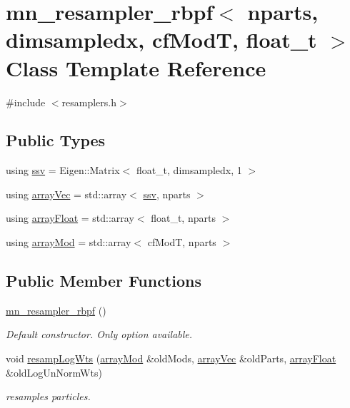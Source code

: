 \hypertarget{classmn__resampler__rbpf}{}\section{mn\+\_\+resampler\+\_\+rbpf$<$ nparts, dimsampledx, cf\+ModT, float\+\_\+t $>$ Class Template Reference}
\label{classmn__resampler__rbpf}


{\ttfamily \#include $<$resamplers.\+h$>$}

\subsection*{Public Types}
\begin{DoxyCompactItemize}
\item 
using \hyperlink{classmn__resampler__rbpf_aff8bcd12cfe60425c4406262a9640d68}{ssv} = Eigen\+::\+Matrix$<$ float\+\_\+t, dimsampledx, 1 $>$
\item 
using \hyperlink{classmn__resampler__rbpf_a9eddf10f48c19b555276bbd23826044b}{array\+Vec} = std\+::array$<$ \hyperlink{classmn__resampler__rbpf_aff8bcd12cfe60425c4406262a9640d68}{ssv}, nparts $>$
\item 
using \hyperlink{classmn__resampler__rbpf_a43fa641c6d15c8ee79da47d6af02ac16}{array\+Float} = std\+::array$<$ float\+\_\+t, nparts $>$
\item 
using \hyperlink{classmn__resampler__rbpf_a268fe176a23e146b8f0c1acbaf8625b3}{array\+Mod} = std\+::array$<$ cf\+ModT, nparts $>$
\end{DoxyCompactItemize}
\subsection*{Public Member Functions}
\begin{DoxyCompactItemize}
\item 
\mbox{\label{classmn__resampler__rbpf_acfefe5df6a03b0be01b34477b844a486}} 
\hyperlink{classmn__resampler__rbpf_acfefe5df6a03b0be01b34477b844a486}{mn\+\_\+resampler\+\_\+rbpf} ()
\begin{DoxyCompactList}\small\item\em Default constructor. Only option available. \end{DoxyCompactList}\item 
void \hyperlink{classmn__resampler__rbpf_a1ae1ffd0262e853c601659509fa5e8ea}{resamp\+Log\+Wts} (\hyperlink{classmn__resampler__rbpf_a268fe176a23e146b8f0c1acbaf8625b3}{array\+Mod} \&old\+Mods, \hyperlink{classmn__resampler__rbpf_a9eddf10f48c19b555276bbd23826044b}{array\+Vec} \&old\+Parts, \hyperlink{classmn__resampler__rbpf_a43fa641c6d15c8ee79da47d6af02ac16}{array\+Float} \&old\+Log\+Un\+Norm\+Wts)
\begin{DoxyCompactList}\small\item\em resamples particles. \end{DoxyCompactList}\end{DoxyCompactItemize}
